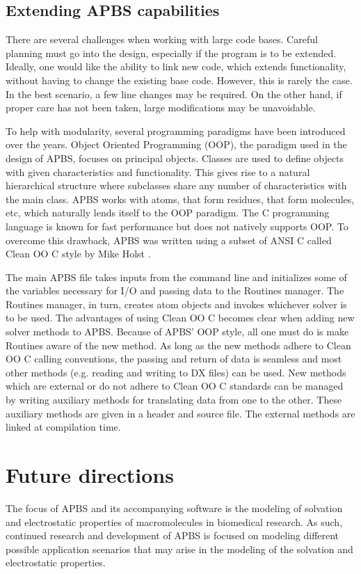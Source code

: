 \documentclass[11pt,titlepage]{article}
\begin{document}
\subsection{Extending APBS capabilities}
There are several challenges when working with large code bases. Careful planning must go into the design, especially if the program is to be extended. Ideally, one would like the ability to link new code, which extends functionality, without having to change the existing base code. However, this is rarely the case. In the best scenario, a few line changes may be required. On the other hand, if proper care has not been taken, large modifications may be unavoidable.

To help with modularity, several programming paradigms have been introduced over the years. Object Oriented Programming (OOP), the paradigm used in the design of APBS, focuses on principal objects. Classes are used to define objects with given characteristics and functionality. This gives rise to a natural hierarchical structure where subclasses share any number of characteristics with the main class. APBS works with atoms, that form residues, that form molecules, etc, which naturally lends itself to the OOP paradigm. The C programming language is known for fast performance but does not natively supports OOP. To overcome this drawback, APBS was written using a subset of ANSI C called Clean OO C style by Mike Holst \cite{holst2001}. 

The main APBS file takes inputs from the command line and initializes some of the variables necessary for I/O and passing data to the Routines manager. The Routines manager, in turn, creates atom objects and invokes whichever solver is to be used. The advantages of using Clean OO C becomes clear when adding new solver methods to APBS. Because of APBS' OOP style, all one must do is make Routines aware of the new method. As long as the new methods adhere to Clean OO C calling conventions, the passing and return of data is seamless and most other methods (e.g. reading and writing to DX files) can be used. New methods which are external or do not adhere to Clean OO C standards can be managed by writing auxiliary methods for translating data from one to the other. These auxiliary methods are given in a header and source file. The external methods are linked at compilation time.

\section{Future directions}
The focus of APBS and its accompanying software is the modeling of solvation and electrostatic properties of macromolecules in biomedical research. As such, continued research and development of APBS is focused on modeling different possible application scenarios that may arise in the modeling of the solvation and electrostatic properties. 
\end{document}
